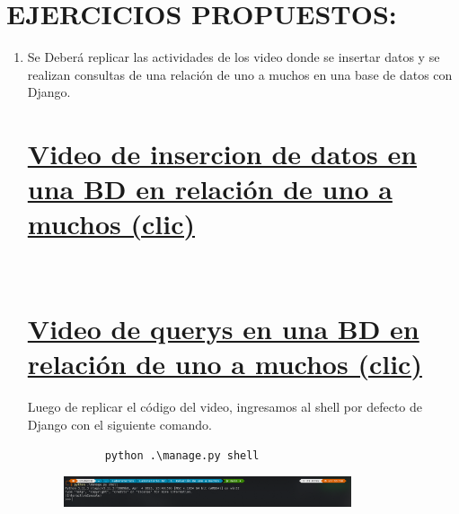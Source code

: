 \documentclass{article}
\begin{document}
	\section{EJERCICIOS PROPUESTOS:}
	\begin{enumerate}
		\item Se Deberá replicar las actividades de los video donde se insertar datos y se realizan consultas de una relación de uno a muchos en una base de datos con Django.
		\setcounter{secnumdepth}{0}
		\section{\normalfont\small\href{https://drive.google.com/file/d/1NxYCU2yBtF7KXXwB2iiNtx_zD5NMiTTF/view}{Video de insercion de datos en una BD en relación de uno a muchos (clic)}}\\
		\section{\normalfont\small\href{https://drive.google.com/file/d/1H1uLOHR2qHNH3VcZUd9JpqcACqX0UpoM/view}{Video de querys en una BD en relación de uno a muchos (clic)}} 
		
		Luego de replicar el código del video, ingresamos al shell por defecto de Django con el siguiente comando.
		\begin{lstlisting}
			python .\manage.py shell
		\end{lstlisting}
		\begin{figure}[H]
			\centering
			\includegraphics[width=0.8\textwidth,keepaspectratio]{img/Ejercicio1/shell.png}
		\end{figure}
		

\end{enumerate}
\end{document}

